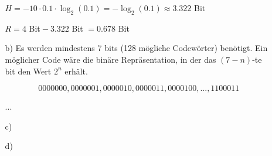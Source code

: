 \documentclass[a4paper,10pt]{scrartcl}
\begin{document}
\begin{enumerate}
\begin{enumerate}
                $H = - 10 \cdot 0.1 \cdot \log_2(0.1) = -\log_2(0.1) \approx 3.322$ Bit

                $R = 4$ Bit${}- 3.322$ Bit $= 0.678$ Bit

            \item[b)]
                Es werden mindestens 7 bits (128 mögliche Codewörter) benötigt. Ein möglicher
                Code wäre die binäre Repräsentation, in der das $(7-n)$-te bit den Wert $2^n$
                erhält.

                $$0000000, 0000001, 0000010, 0000011, 0000100, ..., 1100011$$

                ...

            \item[c)]

            \item[d)]

        \end{enumerate}
\end{enumerate}
\end{document}
